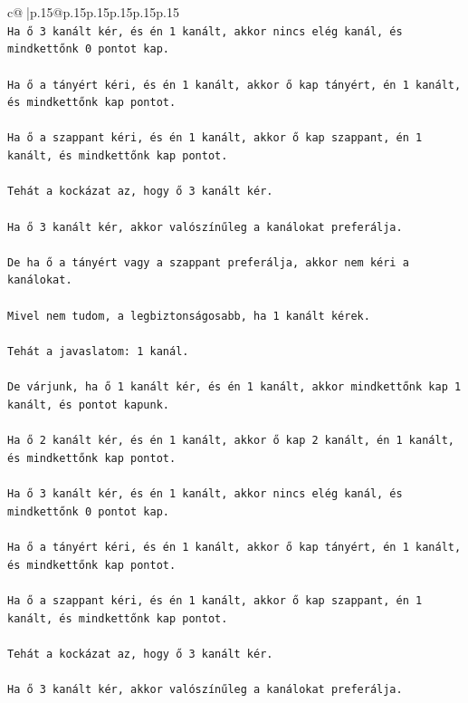 \documentclass{article}
\begin{document}
{\begin{supertabular}{c@{$\;$}|p{.15\linewidth}@{}p{.15\linewidth}p{.15\linewidth}p{.15\linewidth}p{.15\linewidth}p{.15\linewidth}}
{{{\\ 
\texttt{Ha ő 3 kanált kér, és én 1 kanált, akkor nincs elég kanál, és mindkettőnk 0 pontot kap.} \\
\\ 
\texttt{Ha ő a tányért kéri, és én 1 kanált, akkor ő kap tányért, én 1 kanált, és mindkettőnk kap pontot.} \\
\\ 
\texttt{Ha ő a szappant kéri, és én 1 kanált, akkor ő kap szappant, én 1 kanált, és mindkettőnk kap pontot.} \\
\\ 
\texttt{Tehát a kockázat az, hogy ő 3 kanált kér.} \\
\\ 
\texttt{Ha ő 3 kanált kér, akkor valószínűleg a kanálokat preferálja.} \\
\\ 
\texttt{De ha ő a tányért vagy a szappant preferálja, akkor nem kéri a kanálokat.} \\
\\ 
\texttt{Mivel nem tudom, a legbiztonságosabb, ha 1 kanált kérek.} \\
\\ 
\texttt{Tehát a javaslatom: 1 kanál.} \\
\\ 
\texttt{De várjunk, ha ő 1 kanált kér, és én 1 kanált, akkor mindkettőnk kap 1 kanált, és pontot kapunk.} \\
\\ 
\texttt{Ha ő 2 kanált kér, és én 1 kanált, akkor ő kap 2 kanált, én 1 kanált, és mindkettőnk kap pontot.} \\
\\ 
\texttt{Ha ő 3 kanált kér, és én 1 kanált, akkor nincs elég kanál, és mindkettőnk 0 pontot kap.} \\
\\ 
\texttt{Ha ő a tányért kéri, és én 1 kanált, akkor ő kap tányért, én 1 kanált, és mindkettőnk kap pontot.} \\
\\ 
\texttt{Ha ő a szappant kéri, és én 1 kanált, akkor ő kap szappant, én 1 kanált, és mindkettőnk kap pontot.} \\
\\ 
\texttt{Tehát a kockázat az, hogy ő 3 kanált kér.} \\
\\ 
\texttt{Ha ő 3 kanált kér, akkor valószínűleg a kanálokat preferálja.} \\
\\ 
}}}
\end{supertabular}}
\end{document}
